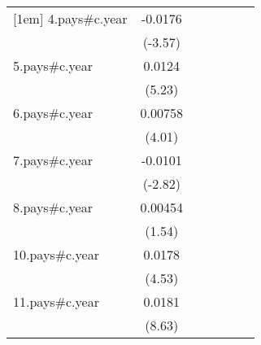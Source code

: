 {\begin{tabular}{l*{6}{c}}
[1em]
4.pays#c.year       &     -0.0176\sym{***}&                     &                     &                     &                     &                     \\
                    &     (-3.57)         &                     &                     &                     &                     &                     \\
[1em]
5.pays#c.year       &      0.0124\sym{***}&                     &                     &                     &                     &                     \\
                    &      (5.23)         &                     &                     &                     &                     &                     \\
[1em]
6.pays#c.year       &     0.00758\sym{***}&                     &                     &                     &                     &                     \\
                    &      (4.01)         &                     &                     &                     &                     &                     \\
[1em]
7.pays#c.year       &     -0.0101\sym{**} &                     &                     &                     &                     &                     \\
                    &     (-2.82)         &                     &                     &                     &                     &                     \\
[1em]
8.pays#c.year       &     0.00454         &                     &                     &                     &                     &                     \\
                    &      (1.54)         &                     &                     &                     &                     &                     \\
[1em]
10.pays#c.year      &      0.0178\sym{***}&                     &                     &                     &                     &                     \\
                    &      (4.53)         &                     &                     &                     &                     &                     \\
[1em]
11.pays#c.year      &      0.0181\sym{***}&                     &                     &                     &                     &                     \\
                    &      (8.63)         &                     &                     &                     &                     &                     \\

\end{tabular}}
